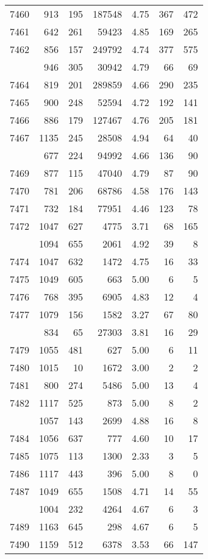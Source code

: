\documentclass[
]{article}
\begin{document}
\begin{table}
\begin{tabular}[t]{lrrrrrr}
7460 & 913 & 195 & 187548 & 4.75 & 367 & 472\\
7461 & 642 & 261 & 59423 & 4.85 & 169 & 265\\
7462 & 856 & 157 & 249792 & 4.74 & 377 & 575\\
\addlinespace
7463 & 946 & 305 & 30942 & 4.79 & 66 & 69\\
7464 & 819 & 201 & 289859 & 4.66 & 290 & 235\\
7465 & 900 & 248 & 52594 & 4.72 & 192 & 141\\
7466 & 886 & 179 & 127467 & 4.76 & 205 & 181\\
7467 & 1135 & 245 & 28508 & 4.94 & 64 & 40\\
\addlinespace
7468 & 677 & 224 & 94992 & 4.66 & 136 & 90\\
7469 & 877 & 115 & 47040 & 4.79 & 87 & 90\\
7470 & 781 & 206 & 68786 & 4.58 & 176 & 143\\
7471 & 732 & 184 & 77951 & 4.46 & 123 & 78\\
7472 & 1047 & 627 & 4775 & 3.71 & 68 & 165\\
\addlinespace
7473 & 1094 & 655 & 2061 & 4.92 & 39 & 8\\
7474 & 1047 & 632 & 1472 & 4.75 & 16 & 33\\
7475 & 1049 & 605 & 663 & 5.00 & 6 & 5\\
7476 & 768 & 395 & 6905 & 4.83 & 12 & 4\\
7477 & 1079 & 156 & 1582 & 3.27 & 67 & 80\\
\addlinespace
7478 & 834 & 65 & 27303 & 3.81 & 16 & 29\\
7479 & 1055 & 481 & 627 & 5.00 & 6 & 11\\
7480 & 1015 & 10 & 1672 & 3.00 & 2 & 2\\
7481 & 800 & 274 & 5486 & 5.00 & 13 & 4\\
7482 & 1117 & 525 & 873 & 5.00 & 8 & 2\\
\addlinespace
7483 & 1057 & 143 & 2699 & 4.88 & 16 & 8\\
7484 & 1056 & 637 & 777 & 4.60 & 10 & 17\\
7485 & 1075 & 113 & 1300 & 2.33 & 3 & 5\\
7486 & 1117 & 443 & 396 & 5.00 & 8 & 0\\
7487 & 1049 & 655 & 1508 & 4.71 & 14 & 55\\
\addlinespace
7488 & 1004 & 232 & 4264 & 4.67 & 6 & 3\\
7489 & 1163 & 645 & 298 & 4.67 & 6 & 5\\
7490 & 1159 & 512 & 6378 & 3.53 & 66 & 147\\

\end{tabular}
\end{table}
\end{document}
